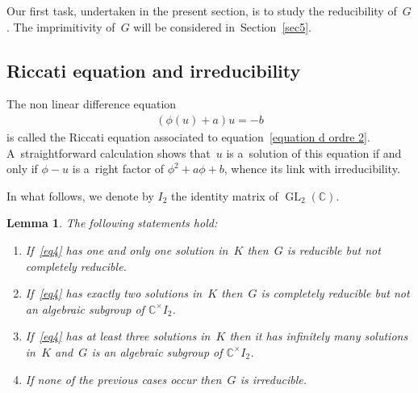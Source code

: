 \documentclass[10pt,a4paper]{amsart}
\numberwithin{equation}{section}
\newtheorem{Lemma}[Theorem]{Lemma}
\begin{document}
Our f\/irst task, undertaken in the present section, is to study the reducibility of~$G$.
The imprimitivity of~$G$ will be considered in~Section~\ref{sec5}.

\subsection{Riccati equation and irreducibility}

The non linear dif\/ference equation
\begin{gather}
\label{eq4}
(\phi(u)+a) u=-b
\end{gather}
is called the Riccati equation associated to equation~\eqref{equation d ordre 2}.
A~straightforward calculation shows that~$u$ is a~solution of this equation if and only if $\phi-u$ is a~right factor of
$\phi^{2}+a\phi+b$, whence its link with irreducibility.

In what follows, we denote by $I_{2}$ the identity matrix of $\operatorname{GL}_2(\mathbb C)$.

\begin{Lemma}
\label{lem1}
The following statements hold:
\begin{enumerate}\itemsep=0pt
\item[$1.$] If~\eqref{eq4} has one and only one solution in~$K$ then~$G$ is reducible but not completely reducible.
\item[$2.$] If~\eqref{eq4} has exactly two solutions in~$K$ then~$G$ is completely reducible but not an algebraic subgroup of
$\mathbb C^{\times} I_{2}$.
\item[$3.$] If~\eqref{eq4} has at least three solutions in~$K$ then it has infinitely many solutions in~$K$ and~$G$ is an
algebraic subgroup of $\mathbb C^{\times} I_{2}$.
\item[$4.$] If none of the previous cases occur then~$G$ is irreducible.
\end{enumerate}
\end{Lemma}
\end{document}
